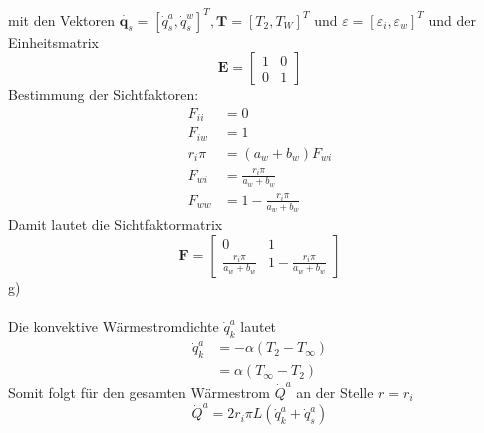 mit den Vektoren $\dot{\textbf{q}_s} = \left[ \dot{q}_s^a , \dot{q}_s^w\right]^T , \textbf{T} = \left[T_2,T_W\right]^T$ und $\varepsilon = \left[\varepsilon_i , \varepsilon_w\right]^T$ und der Einheitsmatrix
\[
	\textbf{E} = \begin{bmatrix}
		1 & 0 \\
		0 & 1
	\end{bmatrix}
\]
Bestimmung der Sichtfaktoren:
\begin{align*}
	F_{ii} &= 0 \\
	F_{iw} &= 1 \\
	r_i\pi &= (a_w + b_w)F_{wi} \\
	F_{wi} &= \frac{r_i\pi}{a_w + b_w} \\
	F_{ww} &= 1 - \frac{r_i\pi}{a_w + b_w}
\end{align*}
Damit lautet die Sichtfaktormatrix
\[
	\textbf{F} = \begin{bmatrix}
		0 & 1 \\
		\frac{r_i\pi}{a_w + b_w} & 1 - \frac{r_i\pi}{a_w + b_w}
	\end{bmatrix}
\]
g)\\ \\
Die konvektive Wärmestromdichte $\dot{q}_k^a$ lautet
\begin{align*}
	\dot{q}_k^a &= - \alpha(T_2 - T_\infty) \\
				&= \alpha (T_\infty - T_2)
\end{align*}
Somit folgt für den gesamten Wärmestrom $\dot{Q}^a$ an der Stelle $r = r_i$
\[
	\dot{Q}^a = 2r_i\pi L (\dot{q}_k^a +\dot{q}_s^a)
\]